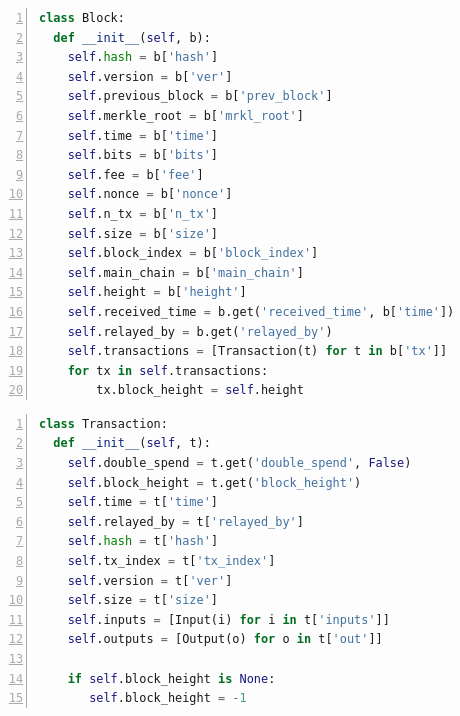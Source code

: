 \documentclass[USenglish]{uit-thesis}
\begin{document}
\begin{appendices}
\begin{lstlisting}[float, numbers=left, frame=single, caption={Application usage.}]
\end{lstlisting}



\begin{lstlisting}[float, numbers=left,frame=single,caption={Block object represented in Python according to api-v1-client-python to retrieve data on the blockchain. The function get\_block() will return an object of this type\,\cite{bitcoin_api}.},language=Python]
class Block:
  def __init__(self, b):
    self.hash = b['hash']
    self.version = b['ver']
    self.previous_block = b['prev_block']
    self.merkle_root = b['mrkl_root']
    self.time = b['time']
    self.bits = b['bits']
    self.fee = b['fee']
    self.nonce = b['nonce']
    self.n_tx = b['n_tx']
    self.size = b['size']
    self.block_index = b['block_index']
    self.main_chain = b['main_chain']
    self.height = b['height']
    self.received_time = b.get('received_time', b['time'])
    self.relayed_by = b.get('relayed_by')
    self.transactions = [Transaction(t) for t in b['tx']]
    for tx in self.transactions:
        tx.block_height = self.height
\end{lstlisting}


\begin{lstlisting}[float, numbers=left,frame=single,caption={Transaction object represented in Python according to api-v1-client-python to retrieve data on the blockchain. The function get\_transaction() will return an object of this type\,\cite{bitcoin_api}.},language=Python]
class Transaction:
  def __init__(self, t):
    self.double_spend = t.get('double_spend', False)
    self.block_height = t.get('block_height')
    self.time = t['time']
    self.relayed_by = t['relayed_by']
    self.hash = t['hash']
    self.tx_index = t['tx_index']
    self.version = t['ver']
    self.size = t['size']
    self.inputs = [Input(i) for i in t['inputs']]
    self.outputs = [Output(o) for o in t['out']]

    if self.block_height is None:
       self.block_height = -1
\end{lstlisting}


\end{appendices}
\end{document}
